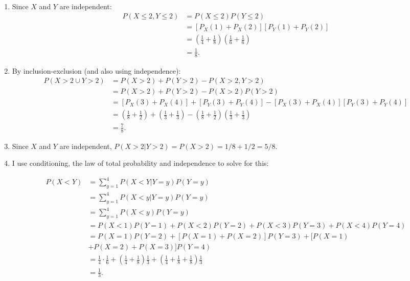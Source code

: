 \begin{problem}{4} $ $
\begin{enumerate}

\item
	Since $X$ and $Y$ are independent:
	\begin{align*}
	P(X \le 2, Y \le 2) &= P(X \le 2)P(Y \le 2) \\
	& = [P_X(1)+P_X(2)][P_Y(1)+P_Y(2)] \\
	& = \left(\frac{1}{4}+\frac{1}{8}\right)\left(\frac{1}{6}+\frac{1}{6}\right) \\
	& = \frac{1}{8}.
	\end{align*} 
	
\item
By inclusion-exclusion (and also using independence):
	\begin{align*}
	P(X > 2 \cup Y> 2) &= P(X > 2)+P(Y > 2) - P(X > 2,Y> 2)\\
	& = P(X > 2)+P(Y > 2) - P(X > 2) P(Y> 2)\\
	& =[P_X(3)+P_X(4)]+[P_Y(3)+P_Y(4)]- [P_X(3)+P_X(4)][P_Y(3)+P_Y(4)]\\
	& = \left(\frac{1}{8}+\frac{1}{2}\right)+\left(\frac{1}{3}+\frac{1}{3}\right)-  \left(\frac{1}{8}+\frac{1}{2}\right)\left(\frac{1}{3}+\frac{1}{3}\right)\\
	& = \frac{7}{8}.
	\end{align*} 
	
\item Since $X$ and $Y$ are independent, $P(X>2|Y>2) = P(X>2)=1/8+1/2=5/8$.

\item I use conditioning, the law of total probability and independence to solve for this:

\begin{align*}
P(X<Y) &= \sum_{y=1}^4 P(X<Y|Y=y)P(Y=y) \\
&= \sum_{y=1}^4 P(X<y|Y=y)P(Y=y) \\
&= \sum_{y=1}^4 P(X<y)P(Y=y) \\
& = P(X<1)P(Y=1)+P(X<2)P(Y=2)+P(X<3)P(Y=3)+P(X<4)P(Y=4) \\
& =P(X=1)P(Y=2)+[P(X=1)+P(X=2)]P(Y=3)+[P(X=1)\\
&+P(X=2)+P(X=3)]P(Y=4) \\
& = \frac{1}{4}\cdot \frac{1}{6}+\left (\frac{1}{4}+\frac{1}{8} \right)\frac{1}{3}+\left(\frac{1}{4}+\frac{1}{8}+\frac{1}{8}\right)\frac{1}{3} \\
&=\frac{1}{3}.
\end{align*}


\end{enumerate}
\end{problem}

